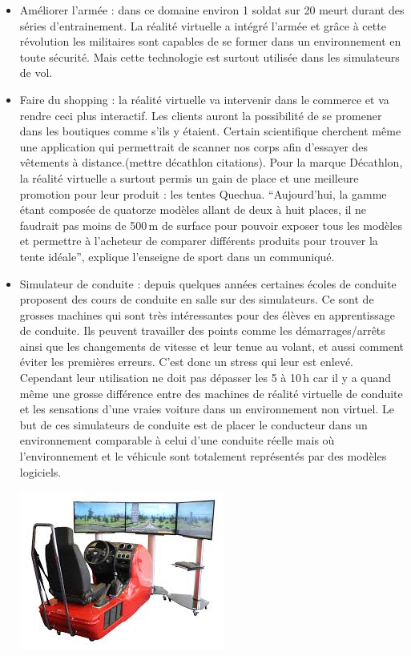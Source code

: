 \documentclass[12pt, a4paper]{report}
\begin{document}
\begin{itemize}
\item Améliorer l'armée : dans ce domaine environ 1 soldat sur 20 meurt durant des séries d'entrainement. La réalité virtuelle a intégré l'armée et grâce à cette révolution les militaires sont capables de se former dans un environnement en toute sécurité. Mais cette technologie est surtout utilisée dans les simulateurs de vol.

\item Faire du shopping : la réalité virtuelle va intervenir dans le commerce et va rendre ceci plus interactif. Les clients auront la possibilité de se promener dans les boutiques comme s'ils y étaient. Certain scientifique cherchent  même une application qui permettrait de scanner nos corps afin d'essayer des vêtements à distance.(mettre décathlon citations). Pour la marque Décathlon, la réalité virtuelle a surtout permis un gain de place et une meilleure promotion pour leur produit : les tentes Quechua. ``Aujourd'hui, la gamme étant composée de quatorze modèles allant de deux à huit places, il ne faudrait pas moins de 500\,m de surface pour pouvoir exposer tous les modèles et permettre à l'acheteur de comparer différents produits pour trouver la tente idéale'', explique l'enseigne de sport dans un communiqué.

\item Simulateur de conduite : depuis quelques années certaines écoles de conduite proposent des cours de conduite en salle sur des simulateurs. Ce sont de grosses machines qui sont très intéressantes pour des élèves en apprentissage de conduite. Ils peuvent travailler des points comme les démarrages/arrêts ainsi que les changements de vitesse et leur tenue au volant, et aussi comment éviter les premières erreurs. C'est donc un stress qui leur est enlevé.\\
Cependant leur utilisation ne doit pas dépasser les 5 à 10\,h car il y a quand même une grosse différence entre des machines de réalité virtuelle de conduite et les sensations d'une vraies voiture dans un environnement non virtuel.
Le but de ces simulateurs de conduite est de placer le conducteur dans un environnement comparable à celui d'une conduite réelle mais où l'environnement et le véhicule sont totalement représentés par des modèles logiciels.
\begin{center}
\includegraphics[scale=0.75]{onduite.jpg}
\end{center}


\end{itemize}
\end{document}
